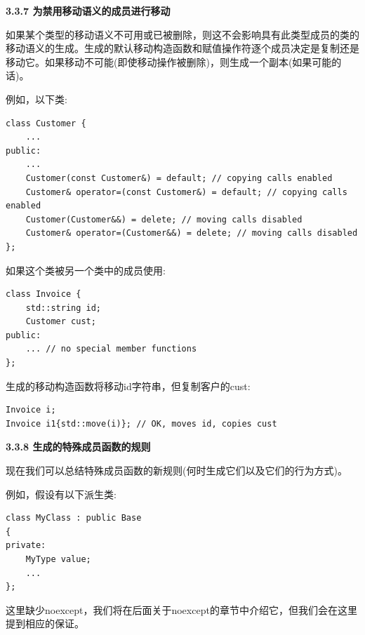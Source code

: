 \hspace*{\fill} \par %
\textbf{3.3.7 为禁用移动语义的成员进行移动}

如果某个类型的移动语义不可用或已被删除，则这不会影响具有此类型成员的类的移动语义的生成。生成的默认移动构造函数和赋值操作符逐个成员决定是复制还是移动它。如果移动不可能(即使移动操作被删除)，则生成一个副本(如果可能的话)。\par

例如，以下类:\par

\begin{lstlisting}[caption={}]
class Customer {
	...
public:
	...
	Customer(const Customer&) = default; // copying calls enabled
	Customer& operator=(const Customer&) = default; // copying calls enabled
	Customer(Customer&&) = delete; // moving calls disabled
	Customer& operator=(Customer&&) = delete; // moving calls disabled
};
\end{lstlisting}

如果这个类被另一个类中的成员使用:\par

\begin{lstlisting}[caption={}]
class Invoice {
	std::string id;
	Customer cust;
public:
	... // no special member functions
};
\end{lstlisting}

生成的移动构造函数将移动id字符串，但复制客户的cust:\par

\begin{lstlisting}[caption={}]
Invoice i;
Invoice i1{std::move(i)}; // OK, moves id, copies cust
\end{lstlisting}

\hspace*{\fill} \par %
\textbf{3.3.8 生成的特殊成员函数的规则}

现在我们可以总结特殊成员函数的新规则(何时生成它们以及它们的行为方式)。\par

例如，假设有以下派生类:\par

\begin{lstlisting}[caption={}]
class MyClass : public Base
{
private:
	MyType value;
	...
};
\end{lstlisting}

这里缺少noexcept，我们将在后面关于noexcept的章节中介绍它，但我们会在这里提到相应的保证。\par

